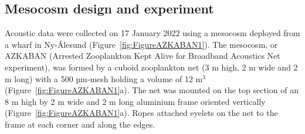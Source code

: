 \subsection{Mesocosm design and experiment}
Acoustic data were collected on 17 January 2022 using a mesocosm deployed from a wharf in Ny-Ålesund (Figure~\ref{fig:FigureAZKABAN1}). The mesocosm, or AZKABAN (Arrested Zooplankton Kept Alive for Broadband Acoustics Net experiment), was formed by a cuboid zooplankton net (3 m high, 2 m wide and 2 m long) with a 500 µm-mesh holding a volume of 12 m$^3$ (Figure~\ref{fig:FigureAZKABAN1}a). The net was mounted on the top section of an 8 m high by 2 m wide and 2 m long aluminium frame oriented vertically (Figure~\ref{fig:FigureAZKABAN1}a). Ropes attached eyelets on the net to the frame at each corner and along the edges.\\  


